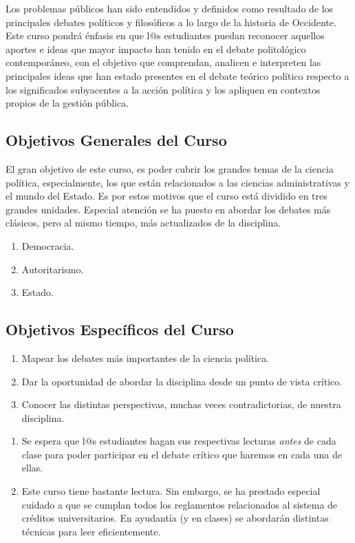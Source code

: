 \documentclass[letterpaper]{article}
\begin{document}
Los problemas p\'ublicos han sido entendidos y definidos como resultado de los principales debates pol\'iticos y filos\'oficos a lo largo de la historia de Occidente. Este curso pondr\'a \'enfasis en que l$@$s estudiantes puedan reconocer aquellos aportes e ideas que mayor impacto han tenido en el debate politol\'ogico contempor\'aneo, con el objetivo que comprendan, analicen e interpreten las principales ideas que han estado presentes en el debate te\'orico pol\'itico respecto a los significados subyacentes a la acci\'on pol\'itica y los apliquen en contextos propios de la gesti\'on p\'ublica.

\subsection*{Objetivos Generales del Curso}

El gran objetivo de este curso, es poder cubrir los grandes temas de la ciencia pol\'itica, especialmente, los que est\'an relacionados a las ciencias administrativas y el mundo del Estado. Es por estos motivos que el curso est\'a dividido en tres grandes unidades. Especial atenci\'on se ha puesto en abordar los debates m\'as cl\'asicos, pero al mismo tiempo, m\'as actualizados de la disciplina.


\begin{enumerate}
	\item Democracia.
	\item Autoritarismo.
	\item Estado.
\end{enumerate}
 

\subsection*{Objetivos Espec\'ificos del Curso}

\begin{enumerate}
	\item Mapear los debates m\'as importantes de la ciencia pol\'itica.
	\item Dar la oportunidad de abordar la disciplina desde un punto de vista cr\'itico.
	\item Conocer las distintas perspectivas, muchas veces contradictorias, de nuestra disciplina.
\end{enumerate}


\begin{enumerate}
		\item[{\color{red}\Pointinghand}] Se espera que l$@$s estudiantes hagan sus respectivas lecturas \emph{antes} de cada clase para poder participar en el debate cr\'itico que haremos en cada una de ellas. 

		\item[{\color{red}\Pointinghand}] Este curso tiene bastante lectura. Sin embargo, se ha prestado especial cuidado a que se cumplan todos los reglamentos relacionados al sistema de cr\'editos universitarios. En ayudant\'ia (y en clases) se abordar\'an distintas t\'ecnicas para leer eficientemente.
\end{enumerate}
\end{document}
